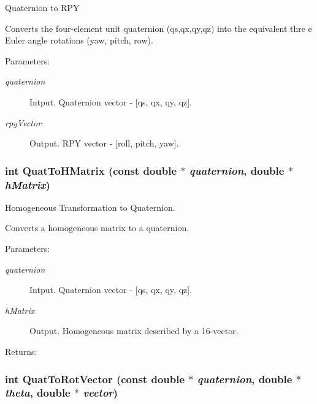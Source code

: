 Quaternion to RPY 

Converts the four-element unit quaternion (qs,qx,qy,qz) into the equivalent thre e Euler angle rotations (yaw, pitch, row).

\begin{Desc}
\item[Parameters:]
\begin{description}
\item[{\em quaternion}]Intput. Quaternion vector - \mbox{[}qs, qx, qy, qz\mbox{]}. \item[{\em rpyVector}]Output. RPY vector - \mbox{[}roll, pitch, yaw\mbox{]}. \end{description}
\end{Desc}
\hypertarget{group__quaternion_gfa6b44f00762a156e643b894e1cd10d9}{
\subsubsection[QuatToHMatrix]{\setlength{\rightskip}{0pt plus 5cm}int QuatToHMatrix (const double $\ast$ {\em quaternion}, \/  double $\ast$ {\em hMatrix})}}
\label{group__quaternion_gfa6b44f00762a156e643b894e1cd10d9}


Homogeneous Transformation to Quaternion. 

Converts a homogeneous matrix to a quaternion.

\begin{Desc}
\item[Parameters:]
\begin{description}
\item[{\em quaternion}]Intput. Quaternion vector - \mbox{[}qs, qx, qy, qz\mbox{]}. \item[{\em hMatrix}]Output. Homogeneous matrix described by a 16-vector.\end{description}
\end{Desc}
\begin{Desc}
\item[Returns:]\end{Desc}
\hypertarget{group__quaternion_g5c214fb206a96292a7596d1df089f52e}{
\subsubsection[QuatToRotVector]{\setlength{\rightskip}{0pt plus 5cm}int QuatToRotVector (const double $\ast$ {\em quaternion}, \/  double $\ast$ {\em theta}, \/  double $\ast$ {\em vector})}}
\label{group__quaternion_g5c214fb206a96292a7596d1df089f52e}


